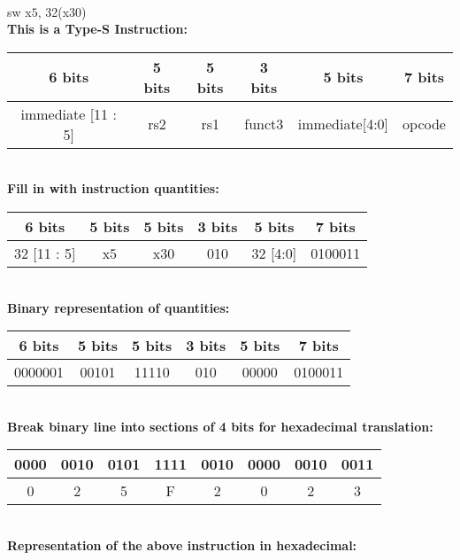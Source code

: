 \documentclass[12pt]{article}
\begin{document}
		\begin{center}
			 \vspace{0.4cm}\\
			sw x$5$, 32(x$30$)  \vspace{0.4cm}\\
			\textbf{This is a Type-S Instruction:} \vspace{0.15cm}\\
			\begin{tabular}{ |c|c|c|c|c|c| } 
				\hline
				6 bits & 5 bits & 5 bits & 3 bits & 5 bits & 7 bits \\
				\hline
				immediate [11 : 5] & rs2 & rs1 & funct3 & immediate[4:0] & opcode \\
				\hline
			\end{tabular}
			 \vspace{0.6cm} \\
			
			\textbf{Fill in with instruction quantities:} \vspace{0.15cm}\\
			\begin{tabular}{ |c|c|c|c|c|c| } 
				\hline
				6 bits & 5 bits & 5 bits & 3 bits & 5 bits & 7 bits \\
				\hline
				32 [11 : 5] & x$5$ & x$30$ & 010 & 32 [4:0] & 0100011 \\
				\hline
			\end{tabular}
			\vspace{0.6cm} \\
			
			\textbf{Binary representation of quantities:} \vspace{0.15cm}\\
			\begin{tabular}{ |c|c|c|c|c|c| } 
				\hline
				6 bits & 5 bits & 5 bits & 3 bits & 5 bits & 7 bits \\
				\hline
				0000001 & 00101 & 11110 & 010 & 00000 & 0100011 \\
				\hline
			\end{tabular}
			\vspace{0.6cm} \\
			
			\textbf{Break binary line into sections of 4 bits for hexadecimal translation:} \vspace{0.15cm}\\
			\begin{tabular}{ |c|c|c|c|c|c|c|c| } 
				\hline
				0000 & 0010 & 0101 & 1111 & 0010 & 0000 & 0010 & 0011 \\
				\hline
				0 & 2 & 5 & F & 2 & 0 & 2 & 3 \\
				\hline
			\end{tabular}
			\vspace{0.6cm} \\
			
			\textbf{Representation of the above instruction in hexadecimal:} \vspace{0.15cm}\\
			 \\
		\end{center}
		
\end{document}
